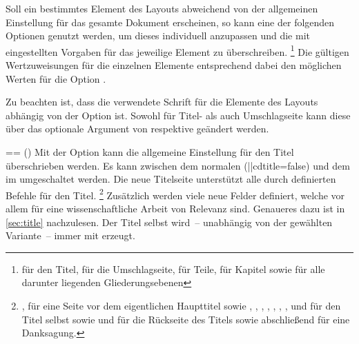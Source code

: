 \begin{DeclareEntity*}{}
\begin{DeclareEntity*}{}
\begin{DeclareEntity*}{}
Soll ein bestimmtes Element des Layouts abweichend von der allgemeinen 
Einstellung für das gesamte Dokument erscheinen, so kann eine der folgenden 
Optionen genutzt werden, um dieses individuell anzupassen und die mit 
 eingestellten Vorgaben für das jeweilige Element zu 
überschreiben.%
\footnote{%
   für den Titel,  für die Umschlagseite,
   für Teile,  für Kapitel sowie
   für alle darunter liegenden Gliederungsebenen%
}
Die gültigen Wertzuweisungen für die einzelnen Elemente entsprechend dabei den 
möglichen Werten für die Option . 

Zu beachten ist, dass die verwendete Schrift für die Elemente des Layouts 
abhängig von der Option  ist. Sowohl für Titel- als auch
Umschlagseite kann diese über das optionale Argument von  
respektive  geändert werden.

\begin{Declaration}
  {}=\cdalias=
  ()
Mit der Option  kann die allgemeine Einstellung für den Titel 
überschrieben werden. Es kann zwischen dem normalen (\Option||{cdtitle=false}) 
und dem im \CD umgeschaltet werden. Die neue Titelseite unterstützt alle durch 
\KOMAScript definierten Befehle für den Titel.%
\footnote{%
  , 
   für eine Seite vor dem eigentlichen 
  Haupttitel sowie , 
  , ,
  , ,
  , , 
   und  für den 
  Titel selbst sowie  und
   für die Rückseite des 
  Titels sowie abschließend  für eine 
  Danksagung.
}
Zusätzlich werden viele neue Felder definiert, welche vor allem für eine 
wissenschaftliche Arbeit von Relevanz sind. Genaueres dazu ist in 
\autoref{sec:title} nachzulesen. Der Titel selbst wird~-- unabhängig von der 
gewählten Variante~-- immer mit  erzeugt.
\end{Declaration}


\end{DeclareEntity*}
\end{DeclareEntity*}
\end{DeclareEntity*}
